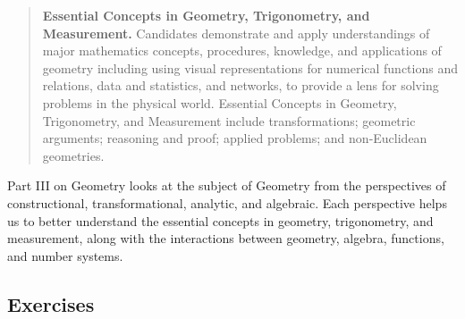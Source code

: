 \documentclass[
]{book}
\theoremstyle{definition}
\theoremstyle{definition}
\theoremstyle{definition}
\theoremstyle{definition}
\theoremstyle{remark}
\begin{document}
\begin{quote}
\textbf{Essential Concepts in Geometry, Trigonometry, and Measurement.} Candidates demonstrate and apply understandings of major mathematics concepts, procedures, knowledge, and applications of geometry including using visual representations for numerical functions and relations, data and statistics, and networks, to provide a lens for solving problems in the physical world. Essential Concepts in Geometry, Trigonometry, and Measurement include transformations; geometric arguments; reasoning and proof; applied problems; and non-Euclidean geometries.
\end{quote}

Part III on Geometry looks at the subject of Geometry from the perspectives of constructional, transformational, analytic, and algebraic. Each perspective helps us to better understand the essential concepts in geometry, trigonometry, and measurement, along with the interactions between geometry, algebra, functions, and number systems.

\hypertarget{exercises-2}{%
\subsection{Exercises}\label{exercises-2}}
\end{document}
